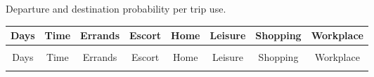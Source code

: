 \begin{center}
    \begin{table}[h]
      \caption{Departure and destination probability per trip use.} 
    \end{table}
    \begin{longtable}{cccccccc}
        Days & Time & Errands & Escort & Home & Leisure & Shopping & Workplace \\ \hline
         & & & & & & & \\
        \endfirsthead
        Days & Time & Errands & Escort & Home & Leisure & Shopping & Workplace \\ \hline
        & & & & & & & \\
        \endhead
        

\end{longtable}
\end{center}
